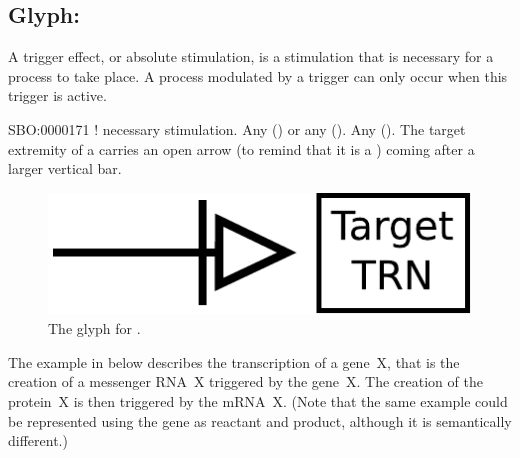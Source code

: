 

\subsection{Glyph: }\label{sec:trigger}

A trigger effect, or absolute stimulation, is a stimulation that is necessary for a process to take place. A process modulated by a trigger can only occur when this trigger is active.

\begin{glyphDescription}
 \glyphSboTerm SBO:0000171 ! necessary stimulation.
 \glyphOrigin Any  () or any  ().
 \glyphTarget Any  ().
 \glyphNode The target extremity of a  carries an open arrow (to remind that it is a ) coming after a larger vertical bar.
 \end{glyphDescription}

\begin{figure}[H]
  \centering
  \includegraphics[scale = 0.5]{images/trigger}
  \caption{The \PD glyph for .}
  \label{fig:trigger}
\end{figure}

The example in  below describes the transcription of a gene~X, that is the creation of a messenger RNA~X triggered by the gene~X.  The creation of the protein~X is then triggered by the mRNA~X.  (Note that the same example could be represented using the gene as reactant and product, although it is semantically different.)

